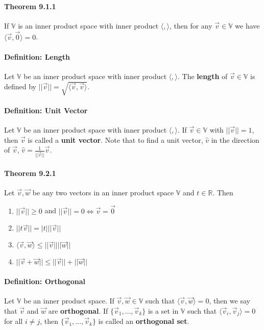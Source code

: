 \documentclass[10pt,letter]{article}
\begin{document}
\paragraph{Theorem 9.1.1} 
If $\mathbb{V}$ is an inner product space with inner product $\langle,\rangle$, then for any $\vec{v}\in\mathbb{V}$ we have $\langle\vec{v},\vec{0}\rangle=0$. 

\paragraph{Definition: Length}
Let $\mathbb{V}$ be an inner product space with inner product $\langle,\rangle$. The \textbf{length} of $\vec{v}\in\mathbb{V}$ is defined by $||\vec{v}||=\sqrt{\langle\vec{v},\vec{v}\rangle}$. 

\paragraph{Definition: Unit Vector}
Let $\mathbb{V}$ be an inner product space with inner product $\langle,\rangle$. If $\vec{v}\in\mathbb{V}$ with $||\vec{v}||=1$, then $\vec{v}$ is called a \textbf{unit vector}. Note that to find a unit vector, $\hat{v}$ in the direction of $\vec{v}$, $\hat{v}=\frac{1}{||\vec{v}||}\vec{v}$.

\paragraph{Theorem 9.2.1}
Let $\vec{v},\vec{w}$ be any two vectors in an inner product space $\mathbb{V}$ and $t\in\mathbb{R}$. Then \begin{enumerate}
    \item $||\vec{v}||\geq0$ and $||\vec{v}||=0\Leftrightarrow\vec{v}=\vec{0}$ 
    \item $||t\vec{v}||=|t|||\vec{v}||$ 
    \item $\langle\vec{v},\vec{w}\rangle\leq||\vec{v}||||\vec{w}||$ 
    \item $||\vec{v}+\vec{w}||\leq||\vec{v}||+||\vec{w}||$
\end{enumerate}

\paragraph{Definition: Orthogonal}
Let $\mathbb{V}$ be an inner product space. If $\vec{v},\vec{w}\in\mathbb{V}$ such that $\langle\vec{v},\vec{w}\rangle=0$, then we say that $\vec{v}$ and $\vec{w}$ are \textbf{orthogonal}. If $\{\vec{v}_1,\ldots,\vec{v}_k\}$ is a set in $\mathbb{V}$ such that $\langle\vec{v}_i,\vec{v}_j\rangle=0$ for all $i\neq j$, then $\{\vec{v}_1,\ldots,\vec{v}_k\}$ is called an \textbf{orthogonal set}.
\end{document}
